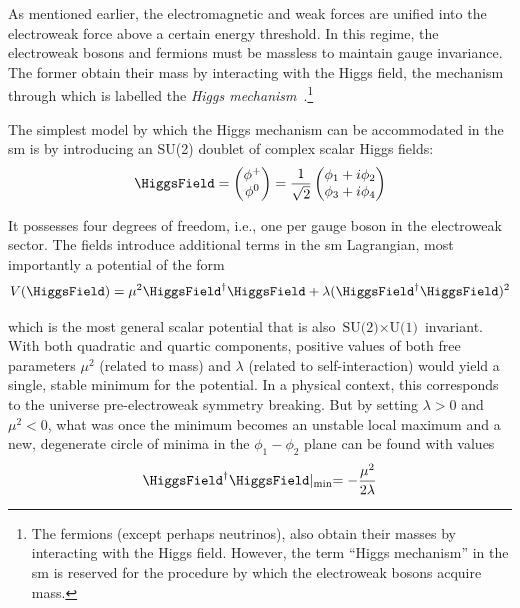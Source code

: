 As mentioned earlier, the electromagnetic and weak forces are unified into the electroweak force above a certain energy threshold. In this regime, the electroweak bosons and fermions must be massless to maintain gauge invariance. The former obtain their mass by interacting with the Higgs field, the mechanism through which is labelled the \emph{Higgs mechanism}~\cite{PhysRevLett.13.321,PhysRevLett.13.508,PhysRevLett.13.585}.\footnote{The fermions (except perhaps neutrinos), also obtain their masses by interacting with the Higgs field. However, the term ``Higgs mechanism'' in the \acrlong{sm} is reserved for the procedure by which the electroweak bosons acquire mass.} 

The simplest model by which the Higgs mechanism can be accommodated in the \acrshort{sm} is by introducing an SU(2) doublet of complex scalar Higgs fields:
\begin{equation}
    \HiggsField = \begin{pmatrix} \phi^+ \\ \phi^0 \end{pmatrix} = \frac{1}{\sqrt{2}} \begin{pmatrix} \phi_1 + i\phi_2 \\ \phi_3 + i\phi_4 \end{pmatrix}
    \label{eq:higgs_field}
\end{equation}

It possesses four degrees of freedom, i.e., one per gauge boson in the electroweak sector. The fields introduce additional terms in the \acrlong{sm} Lagrangian, most importantly a potential of the form
\begin{equation}
    V(\HiggsField) = \mu^2 \HiggsField^{\dagger} \HiggsField + \lambda (\HiggsField^{\dagger} \HiggsField)^2
    \label{eq:higgs_potential}
\end{equation}

which is the most general scalar potential that is also $\text{SU(2)} \times \text{U(1)}$ invariant. With both quadratic and quartic components, positive values of both free parameters $\mu^2$ (related to mass) and $\lambda$ (related to self-interaction) would yield a single, stable minimum for the potential. In a physical context, this corresponds to the universe pre-electroweak symmetry breaking. But by setting $\lambda > \text{0}$ and $\mu^2 < \text{0}$, what was once the minimum becomes an unstable local maximum and a new, degenerate circle of minima in the $\phi_1 - \phi_2$ plane can be found with values
\begin{equation}
    \HiggsField^{\dagger} \HiggsField \lvert_{\mathrm{min}} = -\frac{\mu^2}{2\lambda}
    \label{eq:higgs_mu_lambda}
\end{equation}

